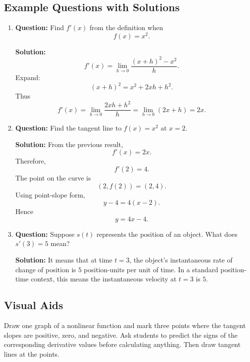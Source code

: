 \documentclass{article}
\begin{document}
\subsection*{Example Questions with Solutions}

\begin{enumerate}
    \item \textbf{Question:} Find $f'(x)$ from the definition when
    \[
        f(x)=x^2.
    \]

    \textbf{Solution:}
    \[
        f'(x)
        =
        \lim_{h\to0}
        \frac{(x+h)^2-x^2}{h}.
    \]
    Expand:
    \[
        (x+h)^2=x^2+2xh+h^2.
    \]
    Thus
    \[
        f'(x)
        =
        \lim_{h\to0}
        \frac{2xh+h^2}{h}
        =
        \lim_{h\to0}(2x+h)
        =
        2x.
    \]

    \item \textbf{Question:} Find the tangent line to $f(x)=x^2$ at $x=2$.

    \textbf{Solution:}
    From the previous result,
    \[
        f'(x)=2x.
    \]
    Therefore,
    \[
        f'(2)=4.
    \]
    The point on the curve is
    \[
        (2,f(2))=(2,4).
    \]
    Using point-slope form,
    \[
        y-4=4(x-2).
    \]
    Hence
    \[
        y=4x-4.
    \]

    \item \textbf{Question:} Suppose $s(t)$ represents the position of an object. What does $s'(3)=5$ mean?

    \textbf{Solution:}
    It means that at time $t=3$, the object's instantaneous rate of change of position is $5$ position-units per unit of time. In a standard position-time context, this means the instantaneous velocity at $t=3$ is $5$.
\end{enumerate}

\subsection*{Visual Aids}

\begin{tcolorbox}[title=Instructor Note]
Draw one graph of a nonlinear function and mark three points where the tangent slopes are positive, zero, and negative. Ask students to predict the signs of the corresponding derivative values before calculating anything. Then draw tangent lines at the points.
\end{tcolorbox}

\end{document}
